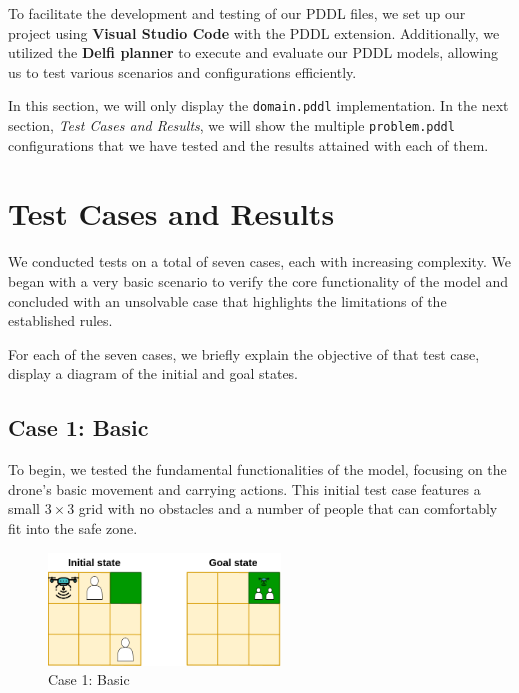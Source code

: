 \documentclass{article}
\begin{document}
To facilitate the development and testing of our PDDL files, we set up our project using \textbf{Visual Studio Code} with the PDDL extension. Additionally, we utilized the \textbf{Delfi planner} to execute and evaluate our PDDL models, allowing us to test various scenarios and configurations efficiently.

In this section, we will only display the \texttt{domain.pddl} implementation. In the next section, \textit{Test Cases and Results}, we will show the multiple \texttt{problem.pddl} configurations that we have tested and the results attained with each of them.

\section{Test Cases and Results}

We conducted tests on a total of seven cases, each with increasing complexity. We began with a very basic scenario to verify the core functionality of the model and concluded with an unsolvable case that highlights the limitations of the established rules.

For each of the seven cases, we briefly explain the objective of that test case, display a diagram of the initial and goal states.


\subsection{Case 1: Basic}

To begin, we tested the fundamental functionalities of the model, focusing on the drone's basic movement and carrying actions. This initial test case features a small \(3 \times 3\) grid with no obstacles and a number of people that can comfortably fit into the safe zone.

\begin{figure}[ht]
    \centering
    \includegraphics[width=0.55\textwidth]{assets/problem-1-basic.drawio.png}
    \caption{Case 1: Basic}
    \label{fig:initial-state}
\end{figure}
\end{document}

